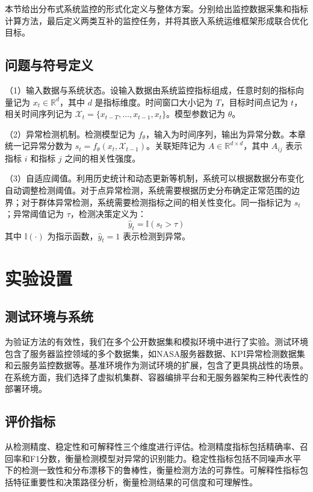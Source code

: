 本节给出分布式系统监控的形式化定义与整体方案。分别给出监控数据采集和指标计算方法，最后定义两类互补的监控任务，并将其嵌入系统运维框架形成联合优化目标。

\subsection{问题与符号定义}\label{ux95eeux9898ux4e0eux7b26ux53f7ux5b9aux4e49}

（1）输入数据与系统状态。设输入数据由系统监控指标组成，任意时刻的指标向量记为 \(x_{t} \in \mathbb{R}^{d}\)，其中 \(d\) 是指标维度。时间窗口大小记为 \(T\)，目标时间点记为 \(t\)，相关时间序列记为 \(\mathcal{X}_{t} = \{x_{t-T}, \ldots, x_{t-1}, x_{t}\}\)。模型参数记为 \(\theta\)。

（2）异常检测机制。检测模型记为 \(f_{\theta}\)，输入为时间序列，输出为异常分数。本章统一记异常分数为 \(s_t = f_{\theta}(x_t, \mathcal{X}_{t-1})\)。关联矩阵记为 \(A \in \mathbb{R}^{d \times d}\)，其中 \(A_{ij}\) 表示指标 \(i\) 和指标 \(j\) 之间的相关性强度。

（3）自适应阈值。利用历史统计和动态更新等机制，系统可以根据数据分布变化自动调整检测阈值。对于点异常检测，系统需要根据历史分布确定正常范围的边界；对于群体异常检测，系统需要检测指标之间的相关性变化。同一指标记为 \(s_t\)；异常阈值记为 \(\tau\)，检测决策定义为：
\[
\hat{y}_t = \mathbb{I}(s_t > \tau)
\]
其中 \(\mathbb{I}(\cdot)\) 为指示函数，\(\hat{y}_t = 1\) 表示检测到异常。

\section{实验设置}\label{ux5b9eux9a8cux8bbeux7f6e}

\subsection{测试环境与系统}

为验证方法的有效性，我们在多个公开数据集和模拟环境中进行了实验。测试环境包含了服务器监控领域的多个数据集，如NASA服务器数据、KPI异常检测数据集和云服务监控数据等。基准环境作为测试环境的扩展，包含了更具挑战性的场景。在系统方面，我们选择了虚拟机集群、容器编排平台和无服务器架构三种代表性的部署环境。

\subsection{评价指标}

从检测精度、稳定性和可解释性三个维度进行评估。检测精度指标包括精确率、召回率和F1分数，衡量检测模型对异常的识别能力。稳定性指标包括不同噪声水平下的检测一致性和分布漂移下的鲁棒性，衡量检测方法的可靠性。可解释性指标包括特征重要性和决策路径分析，衡量检测结果的可信度和可理解性。

